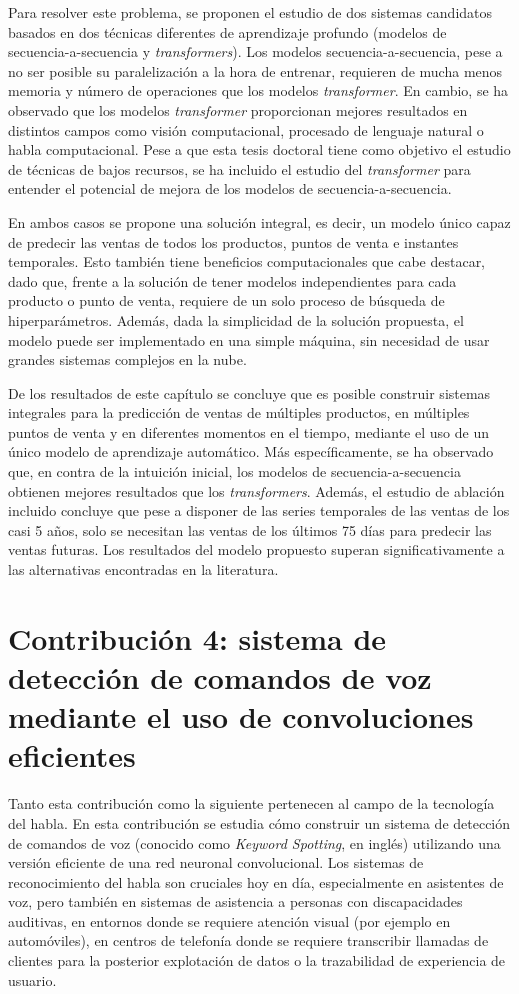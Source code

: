 \documentclass[10pt,a4paper,titlepage,table]{report}
\begin{document}
Para resolver este problema, se proponen el estudio de dos sistemas candidatos basados en dos técnicas diferentes de aprendizaje profundo (modelos de secuencia-a-secuencia y \textit{transformers}). Los modelos secuencia-a-secuencia, pese a no ser posible su paralelización a la hora de entrenar, requieren de mucha menos memoria y número de operaciones que los modelos \textit{transformer}. En cambio, se ha observado que los modelos \textit{transformer} proporcionan mejores resultados en distintos campos como visión computacional, procesado de lenguaje natural o habla computacional. Pese a que esta tesis doctoral tiene como objetivo el estudio de técnicas de bajos recursos, se ha incluido el estudio del \textit{transformer} para entender el potencial de mejora de los modelos de secuencia-a-secuencia. 

En ambos casos se propone una solución integral, es decir, un modelo único capaz de predecir las ventas de todos los productos, puntos de venta e instantes temporales. Esto también tiene beneficios computacionales que cabe destacar, dado que, frente a la solución de tener modelos independientes para cada producto o punto de venta, requiere de un solo proceso de búsqueda de hiperparámetros. Además, dada la simplicidad de la solución propuesta, el modelo puede ser implementado en una simple máquina, sin necesidad de usar grandes sistemas complejos en la nube. 

De los resultados de este capítulo se concluye que es posible construir sistemas integrales para la predicción de ventas de múltiples productos, en múltiples puntos de venta y en diferentes momentos en el tiempo, mediante el uso de un único modelo de aprendizaje automático. Más específicamente, se ha observado que, en contra de la intuición inicial, los modelos de secuencia-a-secuencia obtienen mejores resultados que los \textit{transformers}. Además, el estudio de ablación incluido concluye que pese a disponer de las series temporales de las ventas de los casi 5 años, solo se necesitan las ventas de los últimos 75 días para predecir las ventas futuras. Los resultados del modelo propuesto superan significativamente a las alternativas encontradas en la literatura.

\section*{Contribución 4: sistema de detección de comandos de voz mediante el uso de convoluciones eficientes}

Tanto esta contribución como la siguiente pertenecen al campo de la tecnología del habla. En esta contribución se estudia cómo construir un sistema de detección de comandos de voz (conocido como \textit{Keyword Spotting}, en inglés) utilizando una versión eficiente de una red neuronal convolucional. Los sistemas de reconocimiento del habla son cruciales hoy en día, especialmente en asistentes de voz, pero también en sistemas de asistencia a personas con discapacidades auditivas, en entornos donde se requiere atención visual (por ejemplo en automóviles), en centros de telefonía donde se requiere transcribir llamadas de clientes para la posterior explotación de datos o la trazabilidad de experiencia de usuario. 
\end{document}
